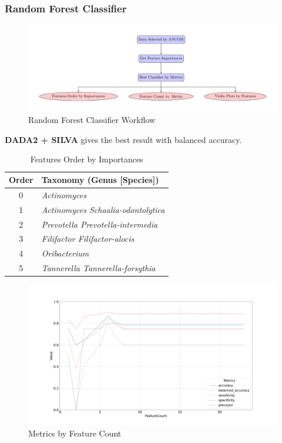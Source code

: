 \documentclass{beamer}
\begin{document}
    \begin{frame}[allowframebreaks]
        \frametitle{Random Forest Classifier}

        \begin{figure}
            \includegraphics[width=0.8 \linewidth]{figures/RandomForest/whole.pdf}
            \caption{Random Forest Classifier Workflow}
        \end{figure}

        \textbf{DADA2 + SILVA} gives the best result with balanced accuracy.

        \begin{table}
            \caption{Features Order by Importances}
            \begin{tabular}{c|l}
                Order & Taxonomy (Genus [Species]) \\ \hline
                0 & \textit{Actinomyces} \\
                1 & \textit{Actinomyces Schaalia-odontolytica} \\
                2 & \textit{Prevotella Prevotella-intermedia} \\
                3 & \textit{Filifactor Filifactor-alocis} \\
                4 & \textit{Oribacterium} \\
                5 & \textit{Tannerella Tannerella-forsythia} \\
            \end{tabular}
        \end{table}

        \begin{figure}
            \includegraphics[width=0.8 \linewidth]{figures/RandomForest/ANCOM.DADA2.silva/metrics.png}
            \caption{Metrics by Feature Count}
        \end{figure}


\end{frame}
\end{document}
